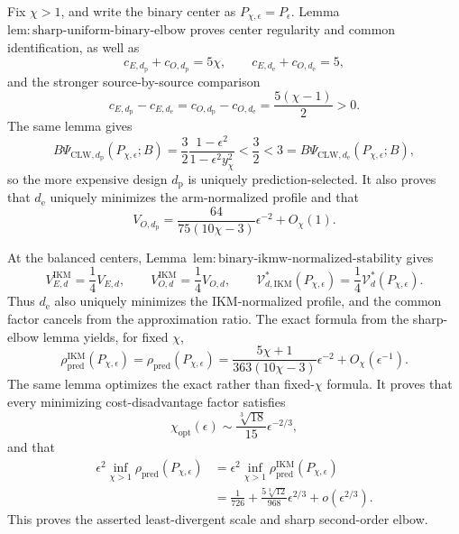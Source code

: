 Fix \(\chi>1\), and write the binary center as \(P_{\chi,\epsilon}=P_\epsilon\). Lemma~\(\mathrm{lem{:}sharp\text{-}uniform\text{-}binary\text{-}elbow}\) proves center regularity and common identification, as well as
\[
 c_{E,d_{\mathrm p}}+c_{O,d_{\mathrm p}}=5\chi,
 \qquad
 c_{E,d_{\mathrm e}}+c_{O,d_{\mathrm e}}=5,
\]
and the stronger source-by-source comparison
\[
 c_{E,d_{\mathrm p}}-c_{E,d_{\mathrm e}}
 =c_{O,d_{\mathrm p}}-c_{O,d_{\mathrm e}}
 =\frac{5(\chi-1)}2>0.                                \tag{1}
\]
The same lemma gives
\[
 B\Psi_{\mathrm{CLW},d_{\mathrm p}}(P_{\chi,\epsilon};B)
 =\frac32\frac{1-\epsilon^2}{1-\epsilon^2y_\chi^2}
 <\frac32<3
 =B\Psi_{\mathrm{CLW},d_{\mathrm e}}(P_{\chi,\epsilon};B), \tag{2}
\]
so the more expensive design \(d_{\mathrm p}\) is uniquely prediction-selected. It also proves that \(d_{\mathrm e}\) uniquely minimizes the arm-normalized profile and that
\[
 V_{O,d_{\mathrm p}}
 =\frac{64}{75(10\chi-3)}\epsilon^{-2}+O_\chi(1).      \tag{3}
\]

At the balanced centers, Lemma~\(\mathrm{lem{:}binary\text{-}ikmw\text{-}normalized\text{-}stability}\) gives
\[
 V_{E,d}^{\mathrm{IKM}}=\frac14V_{E,d},
 \qquad
 V_{O,d}^{\mathrm{IKM}}=\frac14V_{O,d},
 \qquad
 \mathcal V_{d,\mathrm{IKM}}^*(P_{\chi,\epsilon})
 =\frac14\mathcal V_d^*(P_{\chi,\epsilon}).           \tag{4}
\]
Thus \(d_{\mathrm e}\) also uniquely minimizes the IKM-normalized profile, and the common factor cancels from the approximation ratio. The exact formula from the sharp-elbow lemma yields, for fixed \(\chi\),
\[
 \rho_{\mathrm{pred}}^{\mathrm{IKM}}(P_{\chi,\epsilon})
 =\rho_{\mathrm{pred}}(P_{\chi,\epsilon})
 =\frac{5\chi+1}{363(10\chi-3)}\epsilon^{-2}
 +O_\chi(\epsilon^{-1}).                              \tag{5}
\]
The same lemma optimizes the exact rather than fixed-\(\chi\) formula. It proves that every minimizing cost-disadvantage factor satisfies
\[
 \chi_{\mathrm{opt}}(\epsilon)
 \sim \frac{\sqrt[3]{18}}{15}\epsilon^{-2/3},         \tag{6}
\]
and that
\[
\begin{aligned}
 \epsilon^2\inf_{\chi>1}\rho_{\mathrm{pred}}(P_{\chi,\epsilon})
 &=\epsilon^2\inf_{\chi>1}\rho_{\mathrm{pred}}^{\mathrm{IKM}}(P_{\chi,\epsilon})\\
 &=\frac1{726}+\frac{5\sqrt[3]{12}}{968}\epsilon^{2/3}
 +o(\epsilon^{2/3}).                                  \tag{7}
\end{aligned}
\]
This proves the asserted least-divergent scale and sharp second-order elbow.

